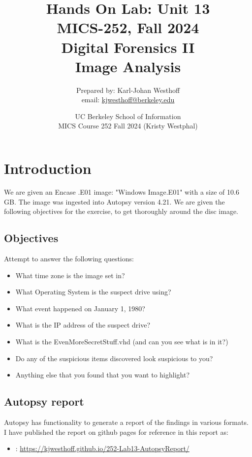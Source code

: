 \documentclass[
	letterpaper, %
	10pt, %
	unnumberedsections, %
	twoside, %
]{APAAssignment}
\title{Hands On Lab: Unit 13 \\ MICS-252, Fall 2024 \\ Digital Forensics II \\ Image Analysis}
\date{UC Berkeley School of Information \\
MICS Course 252 Fall 2024 (Kristy Westphal)
}
\author{
	Prepared by: Karl-Johan Westhoff \\
	email: \href{mailto:kjwesthoff@berkeley.edu}{kjwesthoff@berkeley.edu}
}
\begin{document}
\onecolumn
\maketitle %


\section{Introduction}
We are given an Encase .E01 image: "Windows Image.E01" with a size of 10.6 GB. The image was ingested into Autopsy version 4.21. We are given the following objectives for the exercise, to get thoroughly around the disc image.

\subsection{Objectives}

Attempt to answer the following questions:
\begin{itemize}
	\item What time zone is the image set in?
	\item What Operating System is the suspect drive using?
	\item What event happened on January 1, 1980?
	\item What is the IP address of the suspect drive?
	\item What is the EvenMoreSecretStuff.vhd (and can you see what is in it?)
	\item Do any of the suspicious items discovered look suspicious to you?
	\item Anything else that you found that you want to highlight?
\end{itemize}

\subsection{Autopsy report}
Autopsy has functionality to generate a report of the findings in various formats. I have published the report on github pages for reference in this report as:
\begin{itemize}
	\item	\cite{AutoReport}: \url{https://kjwesthoff.github.io/252-Lab13-AutopsyReport/}
\end{itemize}
\end{document}
